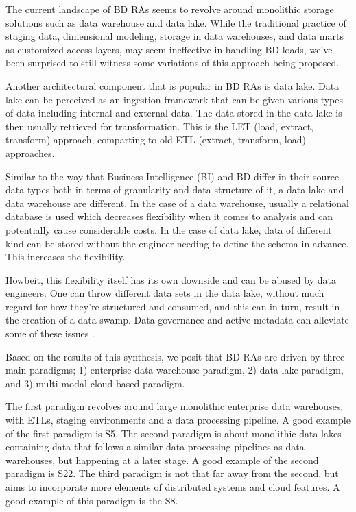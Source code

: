 \documentclass[review]{elsarticle}
\begin{document}
The current landscape of BD RAs seems to revolve around monolithic storage solutions such as data warehouse and data lake. While the traditional practice of staging data, dimensional modeling, storage in data warehouses, and data marts as customized access layers, may seem ineffective in handling BD loads, we've been surprised to still witness some variations of this approach being proposed.  

Another architectural component that is popular in BD RAs is data lake. Data lake can be perceived as an ingestion framework that can be given various types of data including internal and external data. The data stored in the data lake is then usually retrieved for transformation. This is the LET (load, extract, transform) approach, comparting to old ETL (extract, transform, load) approaches. 

Similar to the way that Business Intelligence (BI) and BD differ in their source data types both in terms of granularity and data structure of it, a data lake and data warehouse are different. In the case of a data warehouse, usually a relational database is used which decreases flexibility when it comes to analysis and can potentially cause considerable costs. In the case of data lake, data of different kind can be stored without the engineer needing to define the schema in advance. This increases the flexibility.

Howbeit, this flexibility itself has its own downside and can be abused by data engineers. One can throw different data sets in the data lake, without much regard for how they’re structured and consumed, and this can in turn, result in the creation of a data swamp. Data governance and active metadata can alleviate some of these issues \cite{monolithToMesh}.

Based on the results of this synthesis, we posit that BD RAs are driven by three main paradigms; 1) enterprise data warehouse paradigm, 2) data lake paradigm, and 3) multi-modal cloud based paradigm. 

The first paradigm revolves around large monolithic enterprise data warehouses, with ETLs, staging environments and a data processing pipeline. A good example of the first paradigm is S5. The second paradigm is about monolithic data lakes containing data that follows a similar data processing pipelines as data warehouses, but happening at a later stage. A good example of the second paradigm is S22. The third paradigm is not that far away from the second, but aims to incorporate more elements of distributed systems and cloud features. A good example of this paradigm is the S8.
\end{document}
